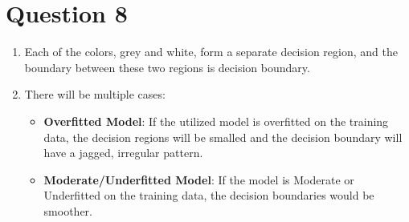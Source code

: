 \documentclass[a4paper,12pt]{article}
\begin{document}
\section*{Question 8}
\begin{enumerate}[label=(\alph*)]
    \item Each of the colors, grey and white, form a separate decision region, and the boundary between these two regions is decision boundary. 
    \item There will be multiple cases:
    \begin{itemize}
        \item \textbf{Overfitted Model}: If the utilized model is overfitted on the training data, the decision regions will be smalled and the decision boundary will have a jagged, irregular pattern. 
        \item \textbf{Moderate/Underfitted Model}: If the model is Moderate or Underfitted on the training data, the decision boundaries would be smoother.
    \end{itemize}
\end{enumerate}
\end{document}
